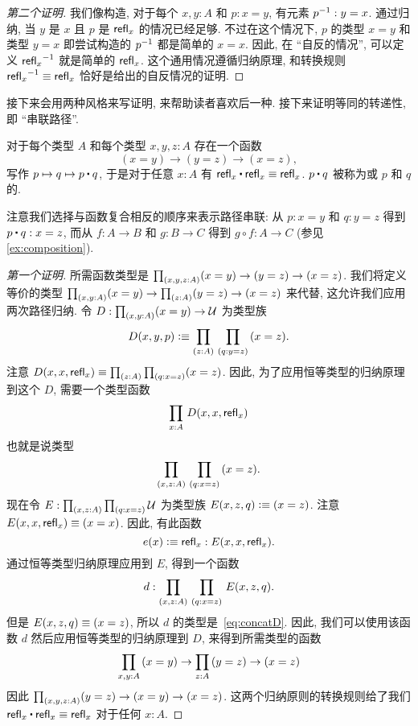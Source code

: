 \begin{proof}[第二个证明]
我们像构造, 对于每个 $x,y:A$ 和 $p:x=y$, 有元素 $\mathord{{p}^{-1}}:y=x$.
通过归纳, 当 $y$ 是 $x$ 且 $p$ 是 $\mathsf{refl}_{x}$ 的情况已经足够.
不过在这个情况下, $p$ 的类型 $x=y$ 和类型 $y=x$ 即尝试构造的 $\mathord{{p}^{-1}}$ 都是简单的 $x=x$.
因此, 在 ``自反的情况'', 可以定义 $\mathord{{\mathsf{refl}_{x}}^{-1}}$ 就是简单的 $\mathsf{refl}_{x}$.
这个通用情况遵循归纳原理, 和转换规则 $\mathord{{\mathsf{refl}_{x}}^{-1}}\equiv\mathsf{refl}_{x}$ 恰好是给出的自反情况的证明.
\end{proof}

接下来会用两种风格来写证明, 来帮助读者喜欢后一种. 接下来证明等同的转递性, 即 ``串联路径''. 

\begin{lem}\label{lem:concat}
对于每个类型 $A$ 和每个类型 $x,y,z:A$ 存在一个函数
\begin{equation*}
(x= y) \to (y= z)\to (x= z),
\end{equation*}
写作 $p \mapsto q \mapsto p\ct q$, 于是对于任意 $x:A$ 有 $\refl{x}\ct \refl{x}\jdeq \refl{x}$.
$p\ct q$ 被称为或 $p$ 和 $q$ 的.
%
%
%
%
%
%
\end{lem}

注意我们选择与函数复合相反的顺序来表示路径串联: 从 $p:x=y$ 和 $q:y=z$ 得到 $p\ct q : x=z$, 而从 $f:A\to B$ 和 $g:B\to C$ 得到 $g\circ f : A\to C$ (参见 \cref{ex:composition}). 

\begin{proof}[第一个证明]
所需函数类型是 $\prd{x,y,z:A} (x= y) \to (y= z)\to (x= z)$.
我们将定义等价的类型 $\prd{x,y:A} (x= y) \to \prd{z:A} (y= z)\to (x= z)$ 来代替, 这允许我们应用两次路径归纳.
令 $D:\prd{x,y:A} (x=y) \to \type$ 为类型族
\begin{equation*}
D(x,y,p)\defeq \prd{z:A}{q:y=z} (x=z).
\end{equation*}
注意 $D(x,x,\refl x) \jdeq \prd{z:A}{q:x=z} (x=z)$.
因此, 为了应用恒等类型的归纳原理到这个 $D$, 需要一个类型函数
\begin{equation}\label{eq:concatD}
\prd{x:A} D(x,x,\refl{x})
\end{equation}
也就是说类型
\[ \prd{x,z:A}{q:x=z} (x=z). \]
现在令 $E:\prd{x,z:A}{q:x=z}\type$ 为类型族 $E(x,z,q)\vcentcolon\equiv (x=z)$.
注意 $E(x,x,\mathsf{refl}_{x}) \equiv (x=x)$.
因此, 有此函数
\begin{equation*}
e(x) \vcentcolon\equiv \mathsf{refl}_{x} : E(x,x,\mathsf{refl}_{x}).
\end{equation*}
通过恒等类型归纳原理应用到 $E$, 得到一个函数
\begin{equation*}
d : \prd{x,z:A}{q:x=z} E(x,z,q).
\end{equation*}
但是 $E(x,z,q)\equiv (x=z)$, 所以 $d$ 的类型是~\eqref{eq:concatD}.
因此, 我们可以使用该函数 $d$ 然后应用恒等类型的归纳原理到 $D$, 来得到所需类型的函数
\begin{equation*}
\prd{x,y:A} (x= y) \to \prd{z:A} (y= z)\to (x= z)
\end{equation*}
因此 $\prd{x,y,z:A} (y=z) \to (x=y) \to (x=z)$.
这两个归纳原则的转换规则给了我们 $\refl{x}\ct \refl{x}\jdeq \refl{x}$ 对于任何 $x:A$.
\end{proof}

